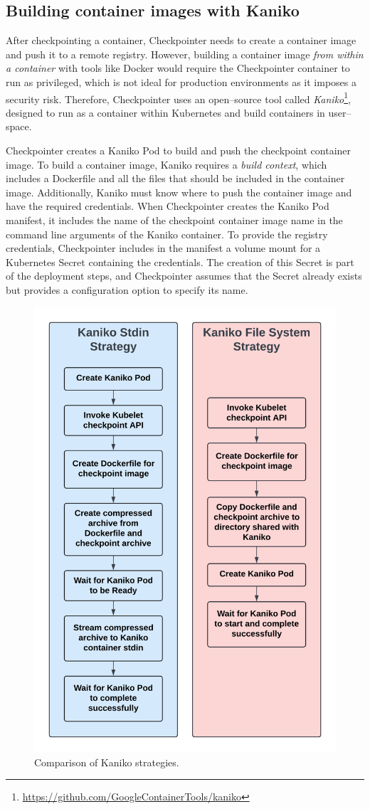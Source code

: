 \documentclass[
  digital,     %
  oneside,     %
  nosansbold,  %
  nocolorbold, %
  lof,         %
  nolot,         %
]{fithesis4}
\begin{document}
\subsection{Building container images with Kaniko}
\label{sec:kaniko-strategies}
After checkpointing a container, Checkpointer needs to create a container image and push it to a remote registry. However, building a container image \emph{from within a container} with tools like Docker would require the Checkpointer container to run as privileged, which is not ideal for production environments as it imposes a security risk. Therefore, Checkpointer uses an open--source tool called \emph{Kaniko}\footnote{\url{https://github.com/GoogleContainerTools/kaniko}}, designed to run as a container within Kubernetes and build containers in user--space.

Checkpointer creates a Kaniko Pod to build and push the checkpoint container image. To build a container image, Kaniko requires a \emph{build context}, which includes a Dockerfile and all the files that should be included in the container image. Additionally, Kaniko must know where to push the container image and have the required credentials. When Checkpointer creates the Kaniko Pod manifest, it includes the name of the checkpoint container image name in the command line arguments of the Kaniko container. To provide the registry credentials, Checkpointer includes in the manifest a volume mount for a Kubernetes Secret containing the credentials. The creation of this Secret is part of the deployment steps, and Checkpointer assumes that the Secret already exists but provides a configuration option to specify its name.

\begin{figure}[H]
  \begin{center}
  \includegraphics[width=.5\textwidth]{figures/kaniko-strategies.png}
  \end{center}
  \caption{Comparison of Kaniko strategies.}
  \label{fig:kaniko-strategies}
\end{figure}
\end{document}
